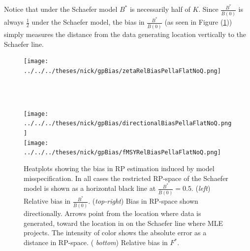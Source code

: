 \documentclass[12pt]{article}
\begin{document}
{%
Notice that under the Schaefer model %
$B^*$ is necessarily half of $K$. Since $\frac{B^*}{\bar B(0)}$ is always 
$\frac{1}{2}$ under the Schaefer model, the bias in $\frac{B^*}{\bar B(0)}$ 
(as seen in Figure (\ref{flatTrio})) simply measures the distance 
from the data generating location vertically to the Schaefer line.  


%
\begin{figure}[h!]
\begin{minipage}[h!]{0.49\textwidth}
\hspace*{-0.5cm}
\texttt{[image: ../../../theses/nick/gpBias/zetaRelBiasPellaFlatNoQ.png]}\\
\caption{\label{flatTrio}
Heatplots showing the bias in RP estimation induced by model misspecification. 
In all cases the restricted RP-space of the Schaefer model is 
shown as a horizontal black line at $\frac{B^*}{\bar B(0)}=0.5$.  
(\emph{left}) Relative bias in $\frac{B^*}{\bar B(0)}$.  (\emph{top-right}) 
Bias in RP-space shown directionally. Arrows point from the location where 
data is generated, toward the location in on the Schaefer line where MLE 
projects. The intensity of color shows the absolute error as a distance in 
RP-space. (\emph{ bottom}) Relative bias in $F^*$.  
}
$~$\\$~$\\
\end{minipage} 
\begin{minipage}[h!]{0.49\textwidth} 
\hspace*{1cm}
\texttt{[image: ../../../theses/nick/gpBias/directionalBiasPellaFlatNoQ.png]}\\
\hspace*{1cm}
\texttt{[image: ../../../theses/nick/gpBias/fMSYRelBiasPellaFlatNoQ.png]}
\end{minipage}
\end{figure}

}
\end{document}
